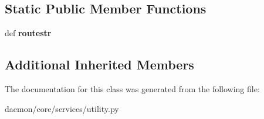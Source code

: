 \subsection*{Static Public Member Functions}
\begin{DoxyCompactItemize}
\item 
\hypertarget{classcore_1_1services_1_1utility_1_1_static_route_service_aeacf887a2fda2f81b3157d39f374dba6}{def {\bfseries routestr}}\label{classcore_1_1services_1_1utility_1_1_static_route_service_aeacf887a2fda2f81b3157d39f374dba6}

\end{DoxyCompactItemize}
\subsection*{Additional Inherited Members}


The documentation for this class was generated from the following file\+:\begin{DoxyCompactItemize}
\item 
daemon/core/services/utility.\+py\end{DoxyCompactItemize}
